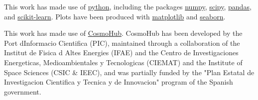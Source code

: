 \documentclass{aa}
\numberwithin{equation}{section}
\begin{document}
{This work has made use of \hyperlink{www.python.org}{python},
including the packages \hyperlink{www.numpy.org}{numpy}, \hyperlink{www.scipy.org}{scipy}, \hyperlink{https://pandas.pydata.org/}{pandas}, and \hyperlink{https://scikit-learn.org/}{scikit-learn}. 
Plots have been produced with \hyperlink{matplotlib.org}{matplotlib} and \hyperlink{https://seaborn.pydata.org/}{seaborn}.

This work has made use of \hyperlink{cosmohub.pic.es}{CosmoHub}.
CosmoHub has been developed by the Port dInformacio Cientifica (PIC), maintained through a collaboration of the Institut de Fisica d Altes Energies (IFAE) and the Centro de Investigaciones Energeticas, Medioambientales y Tecnologicas (CIEMAT) and the Institute of Space Sciences (CSIC \& IEEC), and was partially funded by the "Plan Estatal de Investigacion Cientifica y Tecnica y de Innovacion" program of the Spanish government.

 

 




}
\end{document}

